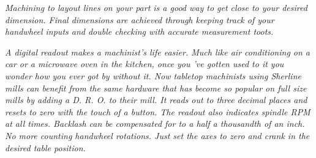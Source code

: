 \bigskip
\textit{Machining to layout lines on your part is a good way to get close to
your desired dimension. Final dimensions are achieved through keeping track of
your handwheel inputs and double checking with accurate measurement toots.}
\bigskip

\textit{A digital readout makes a machinist's life easier. Much like air
conditioning on a car or a microwave oven in the kitchen, once you 've gotten
used to it you wonder how you ever got by without it. Now tabletop machinists
using Sherline mills can benefit from the same hardware that has become so
popular on full size mills by adding a D. R. O. to their mill. It reads out to
three decimal places and resets to zero with the touch of a button. The readout
also indicates spindle RPM at all times. Backlash can be compensated for to a
half a thousandth of an inch. No more counting handwheel rotations. Just set the
axes to zero and crank in the desired table position.}
\bigskip

\secup
